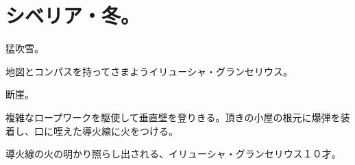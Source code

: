 \section*{シベリア・冬。}

猛吹雪。

地図とコンパスを持ってさまようイリューシャ・グランセリウス。

断崖。

複雑なロープワークを駆使して垂直壁を登りきる。頂きの小屋の根元に爆弾を装着し、口に咥えた導火線に火をつける。

導火線の火の明かり照らし出される、イリューシャ・グランセリウス１０才。
